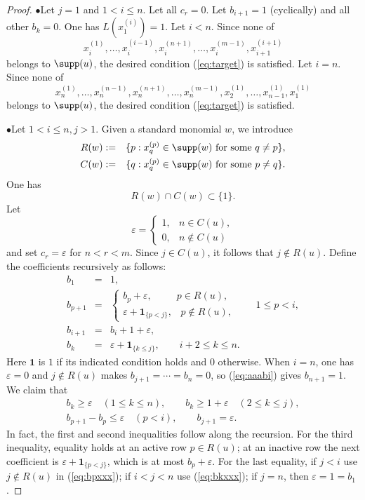 \documentclass[12pt]{amsart}
\numberwithin{equation}{section}
\begin{document}
\begin{proof}
\noindent
$\bullet$\quad   Let $j=1$ and $1 < i \leq n$.  Let all $c_r=0$.  Let $b_{i+1}=1$ (cyclically) and all other $b_k = 0$.  One has $L(x_1^{(i)})=1$.  Let $i < n$.   Since none of $$x_i^{(1)}, \ldots, x_{i}^{(i-1)},x_{i}^{(n+1)}, \ldots, x_{i}^{(m-1)}, x_{i+1}^{(i+1)}$$ belongs to $\supp(u)$, the desired condition (\ref{eq:target}) is satisfied.  Let $i=n$.  Since none of   
$$
x_n^{(1)}, \ldots, x_{n}^{(n-1)}, 
x_n^{(n+1)}, \ldots, x_{n}^{(m-1)},x_2^{(1)}, \ldots, x_{n-1}^{(1)}, x_1^{(1)}
$$
belongs to $\supp(u)$, the desired condition (\ref{eq:target}) is satisfied.

\smallskip

\noindent
$\bullet$\quad   Let $1 < i \leq n, j > 1$. Given a standard monomial $w$, we introduce
\begin{eqnarray*}
R(w)&:=&\{p:x_q^{(p)}\in \supp(w) \text{ for some }q\ne p\},\\
C(w)&:=&\{q:x_q^{(p)}\in \supp(w) \text{ for some }p\ne q\}.
\end{eqnarray*}
One has $$R(w) \cap C(w) \subset \{1\}.$$  Let 
\[
\varepsilon=
\begin{cases}
1,&n\in C(u),\\
0,&n\notin C(u)
\end{cases}
\]
and set $c_r = \varepsilon$ for $n<r<m$.  Since $j\in C(u)$, it follows that $j\notin R(u)$.  Define the coefficients recursively as follows:
\begin{eqnarray}
b_1&=&1,\label{eq:b1xxx}\\
b_{p+1}&=&\begin{cases}
b_p+\varepsilon, \, \, \, \, \, \, \, \, \, \, \, \, \, \, \, p\in R(u),\\
\varepsilon+\mathbf1_{\{p<j\}}, \, \, \, \, \, p\notin R(u),
\end{cases}\qquad 1\le p<i,\label{eq:bpxxx}\\
b_{i+1}&=&b_i+1+\varepsilon,\label{eq:aaabi}\\
b_k&=&\varepsilon+\mathbf1_{\{k\le j\}},\qquad i+2\le k\le n.\label{eq:bkxxx}
\end{eqnarray}
Here $\mathbf1$ is $1$ if its indicated condition holds and $0$ otherwise. When $i=n$, one has $\varepsilon = 0$ and $j \not\in R(u)$ makes $b_{j+1}=\cdots=b_n=0$, so (\ref{eq:aaabi}) gives $b_{n+1}=1$.
% 
We claim that
\begin{equation}\label{eq:consequencesxxx}
\begin{gathered}
b_k\ge\varepsilon\quad(1\le k\le n),\qquad b_k\ge1+\varepsilon\quad(2\le k\le j),\\
b_{p+1}-b_p\le\varepsilon\quad(p<i),\qquad b_{j+1}=\varepsilon.
\end{gathered}
\end{equation}
In fact, the first and second inequalities follow along the recursion.  For the third inequality, equality holds at an active row $p\in R(u)$; at an inactive row the next coefficient is $\varepsilon+\mathbf1_{\{p<j\}}$, which is at most $b_p+\varepsilon$.  For the last equality, if $j<i$ use $j\notin R(u)$ in (\ref{eq:bpxxx}); if $i<j<n$ use (\ref{eq:bkxxx}); if $j=n$, then $\varepsilon=1=b_1$. %


\end{proof}
\end{document}
